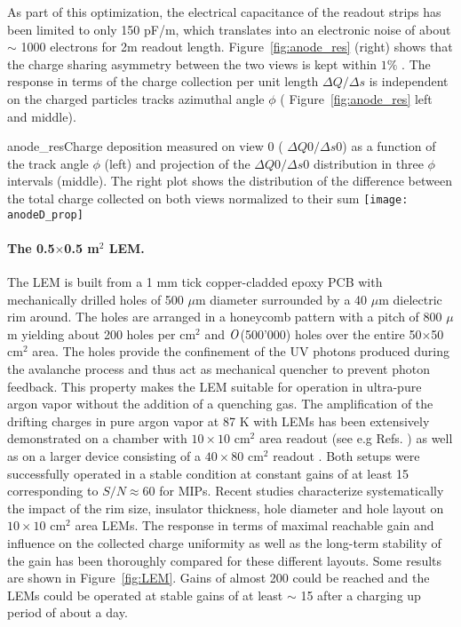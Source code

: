 As part of this optimization, the electrical capacitance of  the readout strips  has been limited to only 150 pF/m, which translates into an  electronic noise of about $\sim$ 1000 electrons for 2m readout length.  Figure~\ref{fig:anode_res} (right) shows that the  charge sharing asymmetry between the two views is kept within $1\%$ . The response in terms of the charge  collection per unit length $\Delta Q/\Delta s$ is independent on the charged particles tracks azimuthal angle $\phi$ ( Figure~\ref{fig:anode_res} left and middle).


\begin{cdrfigure}{anode_res}{Charge deposition measured on view 0 ( $\Delta Q0/\Delta s0$) as a function  of the track angle $\phi$ (left) and projection of the  $\Delta Q0/\Delta s0$ distribution in three $\phi$ intervals (middle). The right plot  shows the distribution of the difference between the total charge  collected on both views normalized to their sum}
\texttt{[image: anodeD\_prop]}
\end{cdrfigure}


\paragraph{The 0.5$\times$0.5 m$^2$ LEM.}
The LEM is built from a 1 mm tick copper-cladded epoxy PCB with mechanically drilled holes of 500 $\mu$m diameter surrounded by a 40 $\mu$m dielectric rim around. The holes are arranged in a honeycomb pattern with a pitch of 800 $\mu$m yielding about 200 holes per cm$^2$ and $\it O$(500'000) holes over the entire 50$\times$50 cm$^2$ area. The holes provide the confinement of the UV photons produced during the avalanche process and thus act as mechanical quencher to prevent photon feedback. This property makes the LEM suitable for operation in ultra-pure argon vapor without the addition  of a quenching gas. The amplification of the drifting charges in pure argon vapor at 87 K with LEMs has been extensively demonstrated on a chamber with $10\times10$ cm$^2$ area readout (see e.g Refs. \cite{Badertscher:2008rf,Badertscher:2010fi} ) as well as on a larger device consisting of a $40\times80$ cm$^2$ readout  \cite{Badertscher:2013wm}.  Both setups were successfully operated in a stable condition at constant gains of at least 15 corresponding to $S/N\approx 60$ for MIPs. Recent studies \cite{Cantini:2014xza}  characterize systematically the impact of the rim size, insulator thickness, hole diameter and hole layout on $10\times10$ cm$^2$ area LEMs. The response in terms of maximal reachable gain and influence on the collected charge uniformity as well as the long-term stability of the gain has been thoroughly compared for these different layouts. Some results are shown in Figure~\ref{fig:LEM}.  Gains of almost 200 could be reached and the LEMs could be operated at stable gains of at least $\sim$ 15 after a charging up period of about a day.

